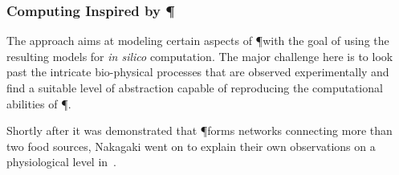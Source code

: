 


		\subsubsection{Computing Inspired by \P}

			The approach aims at modeling certain aspects of \P with the goal of using the resulting models for \textit{in silico} computation. The major challenge here is to look past the intricate bio-physical processes that are observed experimentally and find a suitable level of abstraction capable of reproducing the computational abilities of \P.
			
			Shortly after it was demonstrated that \P forms networks connecting more than two food sources, Nakagaki \etal went on to explain their own observations on a physiological level in~\cite{Tero2006115}. 

